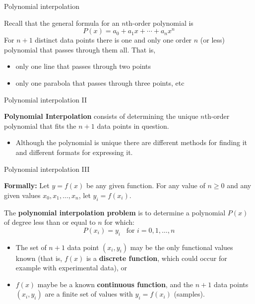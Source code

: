 \documentclass[12pt]{beamer}
\begin{document}
\begin{frame}{Polynomial interpolation} 

Recall that the general formula for an $n$th-order polynomial is
\[
P(x) = a_0 + a_1x + \dotsm + a_nx^n
\]
\noindent 
For $n+1$ distinct data points there is one and only one order $n$ (or less) polynomial that passes through them all. That is,
\begin{itemize}
\item{only one line that passes through two points}
\item{only one parabola that passes through three points, etc}
\end{itemize}
\vspace{2 in}
\end{frame} 

\begin{frame}{Polynomial interpolation II} 

{\bf Polynomial Interpolation} consists of determining the unique $n$th-order polynomial that fits the $n+1$ data points in question.
\begin{itemize}
\item{Although the polynomial is unique there are different methods for finding it and different formats for expressing it.}
\end{itemize}
\vspace{3 in}
\end{frame} 

\begin{frame}{Polynomial interpolation III} 

{\bf Formally:}
Let $y=f(x)$ be any given function. For any value of $n \geq 0$ and any given values 
$x_0, x_1, \dots, x_n$, let $y_i = f(x_i)$. 

\noindent
The {\bf polynomial interpolation problem} 
is to determine a polynomial $P(x)$ of degree less than or equal to $n$ for which: 
\[
P(x_i) = y_i \;\;\; \mbox{for } i=0,1,\dots,n 
\]

\begin{itemize}
\item{The set of $n+1$ data point $(x_i,y_i)$ may be the only functional values known (that is, $f(x)$ is 
a {\bf discrete function}, which could occur for example with experimental data), or} 
\item{$f(x)$ maybe be a known {\bf continuous function}, and the $n+1$ data points $(x_i, y_i)$ are a finite set of values with $y_i = f(x_i)$ (samples).}
\end{itemize} 
\end{frame} 
\end{document}
